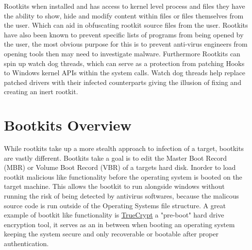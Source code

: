 \documentclass[letterpaper,12pt,titlepage,onecolumn]{IEEEtran}
\begin{document}
Rootkits when installed and has access to kernel level process and files they have the ability to show, hide and modify content within files or files themselves from the user. Which can aid in obfuscating rootkit source files from the user. Rootkits have also been known to prevent specific lists of programs from being opened by the user, the most obvious purpose for this is to prevent anti-virus engineers from opening tools then may need to investigate malware. Furthermore Rootkits can spin up watch dog threads, which can serve as a protection from patching Hooks to Windows kernel APIs within the system calls. Watch dog threads help replace patched drivers with their infected counterparts giving the illusion of fixing and creating an inert rootkit.

\section{Bootkits Overview}
While rootkits take up a more stealth approach to infection of a target, bootkits are vastly different. Bootkits take a goal is to edit the Master Boot Record (MBR) or Volume Boot Record (VBR) of a targets hard disk. Inorder to load rootkit malicious like functionality before the operating system is booted on the target machine. This allows the bootkit to run alongside windows without running the risk of being detected by antivirus softwares, because the malicous source code is run outside of the Operating Systems file structure. A great example of bootkit like functionality is \href{https://en.wikipedia.org/wiki/TrueCrypt}{TrueCrypt} a "pre-boot" hard drive encryption tool, it serves as an in between when booting an operating system keeping the system secure and only recoverable or bootable after proper authentication.
\end{document}
